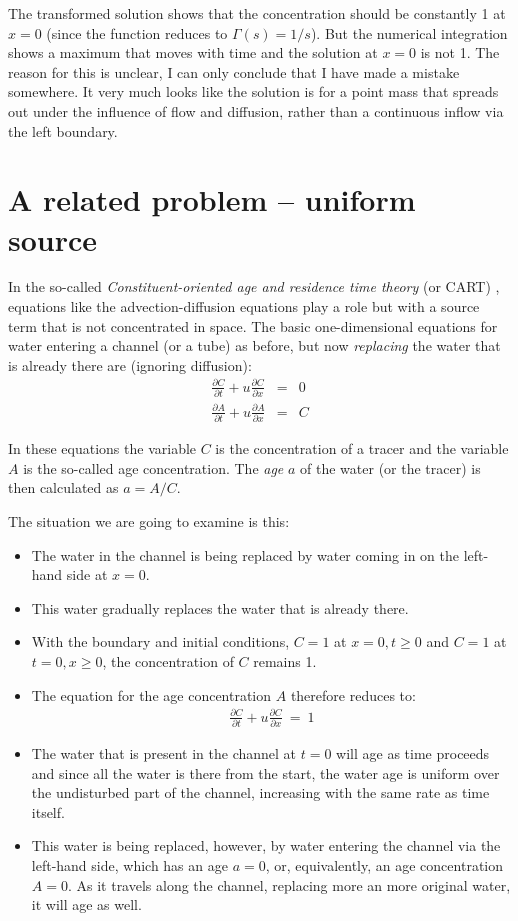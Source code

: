 \documentclass[onecolumn]{article}
\begin{document}
The transformed solution shows that the concentration should be constantly 1 at $x = 0$ (since the function reduces to $\Gamma(s) = 1/s$). But the numerical integration shows
a maximum that moves with time and the solution at $x = 0$ is not 1. The reason for this is unclear, I can only conclude that I
have made a mistake somewhere. It very much looks like the solution is for a point mass that spreads out under the influence
of flow and diffusion, rather than a continuous inflow via the left boundary.


\section*{A related problem -- uniform source}
In the so-called \emph{Constituent-oriented age and residence time theory} (or CART) \cite{ConceptOfAgeMarineModelling}, equations
like the advection-diffusion equations play a role but with a source term that is not concentrated in space.
The basic one-dimensional equations for water entering a channel (or a tube) as before, but now \emph{replacing} the water
that is already there are (ignoring diffusion):
\begin{eqnarray}
\nonumber    \frac{\partial C}{\partial t} + u \frac{\partial C}{\partial x} &=& 0 \\
\nonumber    \frac{\partial A}{\partial t} + u \frac{\partial A}{\partial x} &=& C
\end{eqnarray}

In these equations the variable $C$ is the concentration of a tracer and the variable $A$ is the so-called
age concentration. The \emph{age} $a$ of the water (or the tracer) is then calculated as $a = A/C$.

The situation we are going to examine is this:
\begin{itemize}
\item
The water in the channel is being replaced by water coming in on the left-hand side at $x = 0$.
\item
This water gradually replaces the water that is already there.
\item
With the boundary and initial conditions, $C = 1$ at $x = 0, t \geq 0$ and $C = 1$ at $t = 0, x \geq 0$, the
concentration of $C$ remains 1.
\item
The equation for the age concentration $A$ therefore reduces to:
\begin{eqnarray}
    \frac{\partial C}{\partial t} + u \frac{\partial C}{\partial x} ~=~ 1
\end{eqnarray}
\item
The water that is present in the channel at $t = 0$ will age as time proceeds and since all the water
is there from the start, the water age is uniform over the undisturbed part of the channel, increasing
with the same rate as time itself.
\item
This water is being replaced, however, by water entering the channel via the left-hand side, which has
an age $a = 0$, or, equivalently, an age concentration $A = 0$. As it travels along the channel, replacing
more an more original water, it will age as well.
\end{itemize}
\end{document}

